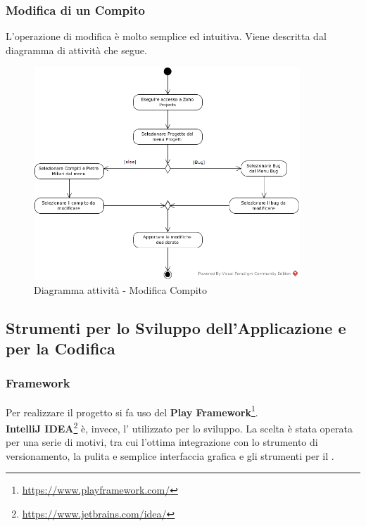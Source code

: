 \subsubsection{Modifica di un Compito}
L'operazione di modifica è molto semplice ed intuitiva. Viene descritta dal diagramma di attività che segue.
\begin{figure}[H]
\centering
\includegraphics[width=10cm]{ModificaCompito.png}
\caption{Diagramma attività - Modifica Compito}
\end{figure}

\subsection{Strumenti per lo Sviluppo dell'Applicazione e per la Codifica}
\subsubsection{Framework}
Per realizzare il progetto si fa uso del  \textbf{Play Framework}\footnote[4]{\url{https://www.playframework.com/}}. \\
\textbf{IntelliJ IDEA}\footnote[5]{\url{https://www.jetbrains.com/idea/}} è, invece, l' utilizzato per lo sviluppo. La scelta è stata operata per una serie di motivi, tra cui l'ottima integrazione con lo strumento di versionamento, la pulita e semplice interfaccia grafica e gli strumenti per il .
